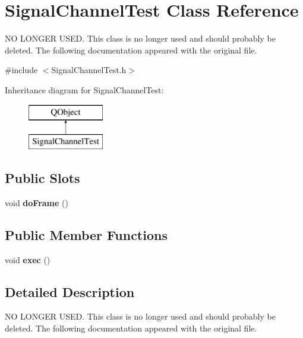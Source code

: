\hypertarget{class_signal_channel_test}{\section{Signal\-Channel\-Test Class Reference}
\label{class_signal_channel_test}
}


N\-O L\-O\-N\-G\-E\-R U\-S\-E\-D. This class is no longer used and should probably be deleted. The following documentation appeared with the original file.  




{\ttfamily \#include $<$Signal\-Channel\-Test.\-h$>$}

Inheritance diagram for Signal\-Channel\-Test\-:\begin{figure}[H]
\begin{center}
\leavevmode
\includegraphics[height=2.000000cm]{class_signal_channel_test}
\end{center}
\end{figure}
\subsection*{Public Slots}
\begin{DoxyCompactItemize}
\item 
\hypertarget{class_signal_channel_test_a6874cd2791f2ef772211362038346f72}{void {\bfseries do\-Frame} ()}\label{class_signal_channel_test_a6874cd2791f2ef772211362038346f72}

\end{DoxyCompactItemize}
\subsection*{Public Member Functions}
\begin{DoxyCompactItemize}
\item 
\hypertarget{class_signal_channel_test_a2c3db5470409b8b26341a5745a3f926b}{void {\bfseries exec} ()}\label{class_signal_channel_test_a2c3db5470409b8b26341a5745a3f926b}

\end{DoxyCompactItemize}


\subsection{Detailed Description}
N\-O L\-O\-N\-G\-E\-R U\-S\-E\-D. This class is no longer used and should probably be deleted. The following documentation appeared with the original file. 

